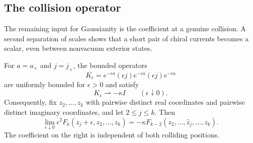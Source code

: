 \subsection{The collision operator}

The remaining input for Gaussianity is the coefficient at a genuine
collision. A second separation of scales shows that a short pair of
chiral currents becomes a scalar, even between nonvacuum exterior states.

\begin{lemma}\label{lem:collision}
For $a=a_+$ and $j=j_+$, the bounded operators
\begin{equation}\label{eq:chiral-collision-operator}
 K_\epsilon=e^{-\epsilon a}(\epsilon j)e^{-\epsilon a}
                      (\epsilon j)e^{-\epsilon a}
\end{equation}
are uniformly bounded for $\epsilon>0$ and satisfy
\begin{equation}\label{eq:chiral-collision-limit}
                    K_\epsilon\rightharpoonup-\kappa I
                       \qquad(\epsilon\downarrow0).
\end{equation}
Consequently, fix $z_2,\ldots,z_k$ with pairwise distinct real
coordinates and pairwise distinct imaginary coordinates, and let
$2\le j\le k$. Then
\begin{equation}\label{eq:chiral-double-pole}
 \lim_{\epsilon\downarrow0}\epsilon^2
 F_k(z_j+\epsilon,z_2,\ldots,z_k)
   =-\kappa F_{k-2}(z_2,\ldots,\widehat z_j,\ldots,z_k).
\end{equation}
The coefficient on the right is independent of both colliding positions.
\end{lemma}

